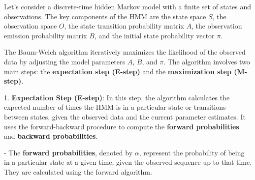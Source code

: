 \documentclass[a4paper,11pt]{article}
\begin{document}

Let's consider a discrete-time hidden Markov model with a finite set of states and observations. The key 
components of the HMM are the state space $S$, the observation space $O$, the state transition probability 
matrix $A$, the observation emission probability matrix $B$, and the initial state probability vector 
$\pi$.

The Baum-Welch algorithm iteratively maximizes the likelihood of the observed data by adjusting the model 
parameters $A$, $B$, and $\pi$. The algorithm involves two main steps: the \textbf{expectation step (E-step)} 
and the \textbf{maximization step (M-step)}.

1. \textbf{Expectation Step (E-step)}: In this step, the algorithm calculates the expected number of times 
the HMM is in a particular state or transitions between states, given the observed data and the current parameter 
estimates. It uses the forward-backward procedure to compute the \textbf{forward probabilities} and 
\textbf{backward probabilities}.

   - The \textbf{forward probabilities}, denoted by $\alpha$, represent the probability of being in a particular 
   state at a given time, given the observed sequence up to that time. They are calculated using the forward 
   algorithm.
\end{document}
